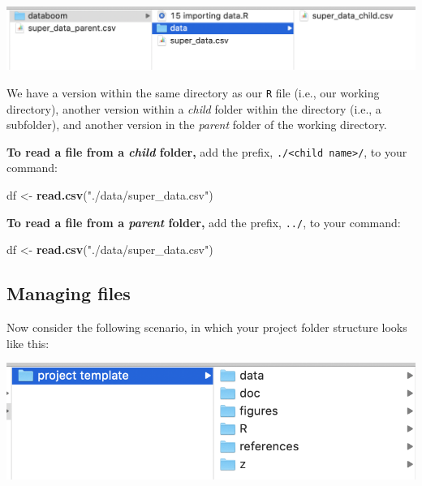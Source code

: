 \documentclass[
]{book}
\newenvironment{Shaded}{\begin{snugshade}}{\end{snugshade}}
\newcommand{\KeywordTok}[1]{\textcolor[rgb]{0.13,0.29,0.53}{\textbf{#1}}}
\newcommand{\NormalTok}[1]{#1}
\newcommand{\StringTok}[1]{\textcolor[rgb]{0.31,0.60,0.02}{#1}}
\begin{document}
\includegraphics{img/csv_wd.png}

We have a version within the same directory as our \texttt{R} file (i.e., our working directory), another version within a \emph{child} folder within the directory (i.e., a subfolder), and another version in the \emph{parent} folder of the working directory.

\textbf{To read a file from a \emph{child} folder,} add the prefix, \texttt{./\textless{}child\ name\textgreater{}/}, to your command:

\begin{Shaded}
\begin{Highlighting}[]
\NormalTok{df <-}\StringTok{ }\KeywordTok{read.csv}\NormalTok{(}\StringTok{"./data/super_data.csv"}\NormalTok{)}
\end{Highlighting}
\end{Shaded}

\textbf{To read a file from a \emph{parent} folder,} add the prefix, \texttt{../}, to your command:

\begin{Shaded}
\begin{Highlighting}[]
\NormalTok{df <-}\StringTok{ }\KeywordTok{read.csv}\NormalTok{(}\StringTok{"./data/super_data.csv"}\NormalTok{)}
\end{Highlighting}
\end{Shaded}

\hypertarget{managing-files}{%
\subsection*{Managing files}\label{managing-files}}

Now consider the following scenario, in which your project folder structure looks like this:

\includegraphics{img/project_template.png}
\end{document}

